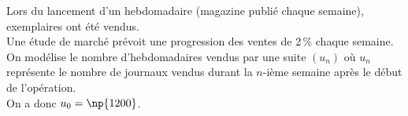 \documentclass[a4paper,11pt,exos]{nsi}
\begin{document}
\maketitle



\exo{}
Lors du lancement d'un hebdomadaire (magazine publié chaque semaine),  exemplaires ont été vendus.\\
Une étude de marché prévoit une progression des ventes de 2\,\% chaque semaine.\\
On modélise le nombre d'hebdomadaires vendus par une suite $\left(u_n\right)$ où $u_n$ représente le nombre de journaux vendus durant la $n$-ième semaine après le début de l'opération.\\
On a donc $u_0 = \np{1200}$.
\end{document}
